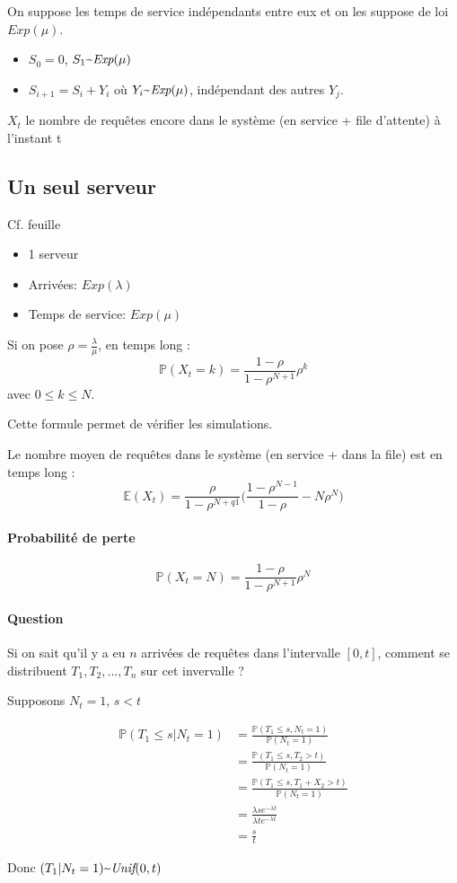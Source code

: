 \documentclass{article}
\newcommand{\textapprox}{\raisebox{0.5ex}{\texttildelow}}
\begin{document}
On suppose les temps de service indépendants entre eux et on les suppose de loi $\textit{Exp}(\mu)$.

\begin{itemize}
  \item $ S_0 = 0 $, $ S_1 \textapprox \textit{Exp}(\mu) $
  \item $ S_{i+1} = S_i + Y_i$ où $Y_i \textapprox \textit{Exp}(\mu)$, indépendant des autres $Y_j$.
\end{itemize}

$X_t$ le nombre de requêtes encore dans le système (en service + file d'attente) à l'instant t

\subsection{Un seul serveur}

Cf. feuille
\begin{itemize}
  \item 1 serveur
  \item Arrivées: $\textit{Exp}(\lambda)$
  \item Temps de service: $\textit{Exp}(\mu)$
\end{itemize}

Si on pose $\rho = \frac{\lambda}{\mu}$, en temps long :
$$ \mathbb{P}(X_t = k) = \frac{1-\rho}{1-\rho^{N+1}} \rho^k $$
avec $0 \leq k \leq N$.

Cette formule permet de vérifier les simulations.

Le nombre moyen de requêtes dans le système (en service + dans la file) est en temps long :
$$ \mathbb{E}(X_t) = \frac{\rho}{1-\rho^{N+q1}} \Big( \frac{1-\rho^{N-1}}{1-\rho}- N\rho^N \Big)$$

\paragraph{Probabilité de perte}
$$ \mathbb{P}(X_t = N) = \frac{1- \rho}{1-\rho^{N+1}}\rho^N $$

\paragraph{Question} Si on sait qu'il y a eu $n$ arrivées de requêtes dans l'intervalle $[0,t]$,
comment se distribuent $T_1, T_2,...,T_n$ sur cet invervalle ?

Supposons $N_t = 1$, $s < t$

\begin{align*}
  \mathbb{P}(T_1 \leq s | N_t = 1) &= \frac{\mathbb{P}(T_1 \leq s, N_t = 1)}{\mathbb{P}(N_t = 1)} \\
  &= \frac{\mathbb{P}(T_1 \leq s, T_2 > t)}{\mathbb{P}(N_t = 1)} \\
  &= \frac{\mathbb{P}(T_1 \leq s, T_1 + X_2 > t)}{\mathbb{P}(N_t = 1)} \\
  &= \frac{\lambda s e^{- \lambda t}}{\lambda t e^{- \lambda t}} \\
  &= \frac{s}{t}
\end{align*}

Donc $(T_1 | N_t = 1) \textapprox \textit{Unif}(0,t)$
\end{document}
